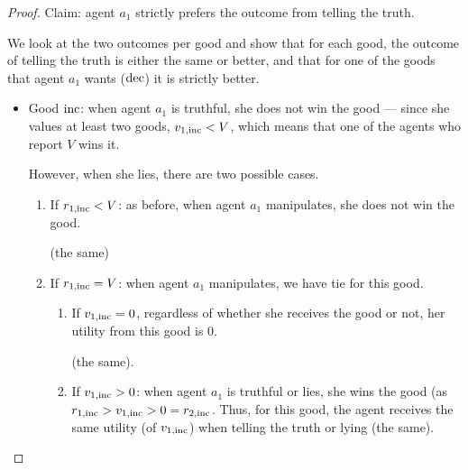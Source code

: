 \begin{proof}
    Claim: agent $a_1$ strictly prefers the outcome from telling the truth.

    We look at the two outcomes per good and show that for each good, the outcome of telling the truth is either the same or better, and that for one of the goods that agent $a_1$ wants ($\mathrm{dec}$) it is strictly better.


    \begin{itemize}
        \item Good $\mathrm{inc}$: when agent $a_1$ is truthful, she does not win the good --- since she values at least two goods, $v_{1,\mathrm{inc}} < V$, which means that one of the agents who report $V$ wins it.
        
        However, when she lies, there are two possible cases.
        \begin{enumerate}
            \item If $r_{1,\mathrm{inc}} < V$:
            as before, when agent $a_1$ manipulates, she does not win the good.
            
            (the same)
            
            \item If $r_{1,\mathrm{inc}} = V$: when agent $a_1$ manipulates, we have tie for this good. 

            \begin{enumerate}
                \item If $v_{1,\mathrm{inc}} = 0$, regardless of whether she receives the good or not, her utility from this good is $0$.
                
                (the same). 

                \item If $v_{1,\mathrm{inc}} > 0$:
                when agent $a_1$ is truthful or lies, she wins the good (as $r_{1,\mathrm{inc}} > v_{1,\mathrm{inc}} > 0 =r_{2,\mathrm{inc}}$.
                Thus, for this good, the agent receives the same utility (of $v_{1,\mathrm{inc}}$) when telling the truth or lying (the same).
            \end{enumerate}
        \end{enumerate}
        

\end{itemize}
\end{proof}
